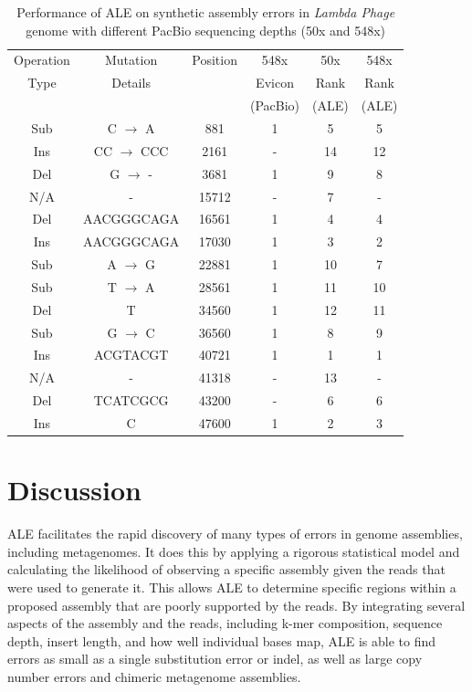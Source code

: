 \documentclass[phd,tocprelim]{cornell}
\begin{document}
\begin{table}[!htp]
        \label{ALEtab2}
    \begin{center}
        \begin{tabular}{cccccc}
Operation & Mutation & Position & 548x& 50x & 548x\\
Type & Details & & Evicon & Rank & Rank\\
 & & & (PacBio) & (ALE) & (ALE)\\
\hline
Sub & C $\rightarrow$ A & 881 & 1 & 5 & 5\\
Ins & CC $\rightarrow$ CCC & 2161 & - & 14 & 12\\
Del & G $\rightarrow$ - & 3681 & 1 & 9 & 8\\
N/A & - & 15712 & - & 7 & -\\
Del & AACGGGCAGA & 16561 & 1 & 4 & 4\\
Ins & AACGGGCAGA & 17030 & 1 & 3 & 2\\
Sub & A $\rightarrow$ G & 22881 & 1 & 10 & 7\\
Sub & T $\rightarrow$ A & 28561 & 1 & 11 & 10\\
Del & T & 34560 & 1 & 12 & 11\\
Sub & G $\rightarrow$ C & 36560 & 1 & 8 & 9\\
Ins & ACGTACGT & 40721 & 1 & 1 & 1\\
N/A & - & 41318 & - & 13 & -\\
Del & TCATCGCG & 43200 & - & 6 & 6\\
Ins & C & 47600 & 1 & 2 & 3
\end{tabular}
\end{center}
\caption[Real Data ALE vs. PacBio]{Performance of ALE on synthetic assembly errors in {\it Lambda Phage} genome with different PacBio sequencing depths (50x and 548x)}
\end{table}

\section{Discussion}

ALE facilitates the rapid discovery of many types of errors in genome assemblies, including metagenomes. It does this by applying a rigorous statistical model and calculating the likelihood of observing a specific assembly given the reads that were used to generate it. This allows ALE to determine specific regions within a proposed assembly that are poorly supported by the reads. By integrating several aspects of the assembly and the reads, including k-mer composition, sequence depth, insert length, and how well individual bases map, ALE is able to find errors as small as a single substitution error or indel, as well as large copy number errors and chimeric metagenome assemblies.
\end{document}
